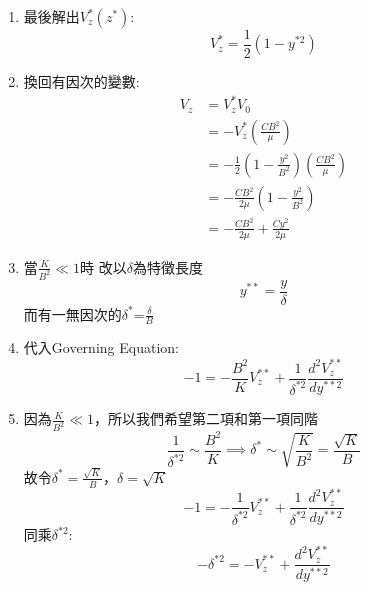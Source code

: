 \documentclass[../main.tex]{subfiles}
\begin{document}
\begin{itemize}
\begin{enumerate}
    \begin{align}
      C_1 &= 0\\
      C_2 &= \frac{1}{2}
    \end{align}
    \item 最後解出$V_z^\ast(z^\ast)$:
    \begin{equation}
      V_z^\ast = \frac{1}{2} \left(1 - y^{\ast 2}\right)
    \end{equation}
    \item 換回有因次的變數:
    \begin{align}
      V_z &= V_z^\ast V_0 \nonumber\\
         &= -V_z^\ast \left(\frac{CB^2}{\mu}\right) \nonumber\\
          &= -\frac{1}{2} \left(1 - \frac{y^2}{B^2}\right) \left(\frac{CB^2}{\mu}\right) \nonumber\\
          &= -\frac{CB^2}{2\mu}\left(1- \frac{y^2}{B^2}\right) \nonumber\\
          &= \boxed{-\frac{CB^2}{2\mu} + \frac{Cy^2}{2\mu}}
    \end{align}
    \item 當$\frac{K}{B^2}\ll1$時
    改以$\delta$為特徵長度
    \begin{equation}
      y^{\ast\ast} = \frac{y}{\delta}
    \end{equation}
    而有一無因次的$\delta^\ast$=$\frac{\delta}{B}$
    \item 代入Governing Equation:
    \begin{equation}
      -1 = -\frac{B^2}{K} V_z^{\ast\ast} +  \frac{1}{\delta^{\ast 2}}\frac{d^2 V_z^{\ast\ast}}{dy^{\ast\ast 2}}
    \end{equation}
    \item 因為$\frac{K}{B^2}\ll1$，所以我們希望第二項和第一項同階
    \begin{equation}
      \frac{1}{\delta^{\ast 2}} \sim \frac{B^2}{K} \implies \delta^\ast \sim \sqrt{\frac{K}{B^2}} = \frac{\sqrt{K}}{B}
    \end{equation}
    故令$\delta^\ast = \frac{\sqrt{K}}{B}$，$\delta = \sqrt{K}$
    \begin{equation}
      -1 = - \frac{1}{\delta^{\ast 2}} V_z^{\ast\ast} + \frac{1}{\delta^{\ast 2}}\frac{d^2 V_z^{\ast\ast}}{dy^{\ast\ast 2}} 
    \end{equation}
    同乘$\delta^{\ast 2}$:
    \begin{equation}
      -\delta^{\ast 2} = - V_z^{\ast\ast} + \frac{d^2 V_z^{\ast\ast}}{dy^{\ast\ast 2}} 
    \end{equation}

\end{enumerate}
\end{itemize}
\end{document}
